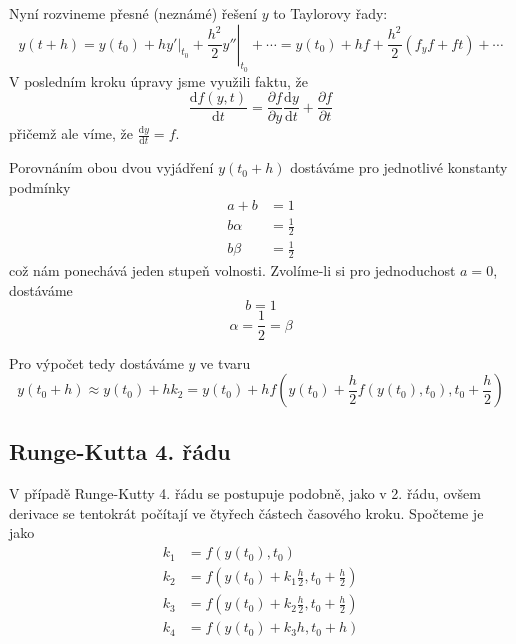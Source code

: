 \documentclass[a4paper,11pt]{article}
\begin{document}
Nyní rozvineme přesné (neznámé) řešení $y$ to Taylorovy řady:
\begin{equation*}
    y(t + h) = y(t_0) + \left. hy' \right\rvert_{t_0} + \left. \frac{h^2}{2} y'' \right\rvert_{t_0} + \cdots = y(t_0) + hf + \frac{h^2}{2} (f_y f + ft) + \cdots
\end{equation*}
V posledním kroku úpravy jsme využili faktu, že
\begin{equation*}
    \frac{\mathrm{d} f(y, t)}{\mathrm{d} t} = \frac{\partial f}{\partial y} \frac{\mathrm{d} y}{\mathrm{d} t} + \frac{\partial f}{\partial t}
\end{equation*}
přičemž ale víme, že $\frac{\mathrm{d} y}{\mathrm{d} t} = f$.

Porovnáním obou dvou vyjádření $y(t_0 + h)$ dostáváme pro jednotlivé konstanty podmínky
\begin{align*}
    a + b &= 1 \\
    b \alpha &= \frac{1}{2} \\
    b \beta &= \frac{1}{2}
\end{align*}
což nám ponechává jeden stupeň volnosti. Zvolíme-li si pro jednoduchost $a=0$, dostáváme
\begin{equation*}
    b = 1
\end{equation*}
\begin{equation*}
    \alpha = \frac{1}{2} = \beta
\end{equation*}

Pro výpočet tedy dostáváme $y$ ve tvaru
\begin{equation*}
    y(t_0 + h) \approx y(t_0) + h k_2 = y(t_0) + h f\left(y(t_0) + \frac{h}{2} f(y(t_0), t_0), t_0 + \frac{h}{2}\right)
\end{equation*}

\subsection{Runge-Kutta 4. řádu}

V případě Runge-Kutty 4. řádu se postupuje podobně, jako v 2. řádu, ovšem derivace se tentokrát počítají ve čtyřech částech
časového kroku. Spočteme je jako
\begin{align*}
    k_1 &= f(y(t_0), t_0) \\
    k_2 &= f(y(t_0) + k_1 \frac{h}{2}, t_0 + \frac{h}{2}) \\
    k_3 &= f(y(t_0) + k_2 \frac{h}{2}, t_0 + \frac{h}{2}) \\
    k_4 &= f(y(t_0) + k_3 h, t_0 + h)
\end{align*}
\end{document}
